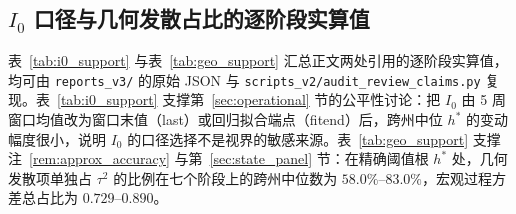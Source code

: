 \documentclass[10pt,UTF8,a4paper,zihao=-4]{ctexart}
\theoremstyle{plain}
\theoremstyle{remark}
\begin{document}
\subsection{$I_0$ 口径与几何发散占比的逐阶段实算值}\label{app:support}

表~\ref{tab:i0_support} 与表~\ref{tab:geo_support} 汇总正文两处引用的逐阶段实算值，均可由 \texttt{reports\_v3/} 的原始 JSON 与 \texttt{scripts\_v2/audit\_review\_claims.py} 复现。表~\ref{tab:i0_support} 支撑第~\ref{sec:operational} 节的公平性讨论：把 $I_0$ 由 5 周窗口均值改为窗口末值（\textsf{last}）或回归拟合端点（\textsf{fitend}）后，跨州中位 $h^*$ 的变动幅度很小，说明 $I_0$ 的口径选择不是视界的敏感来源。表~\ref{tab:geo_support} 支撑注~\ref{rem:approx_accuracy} 与第~\ref{sec:state_panel} 节：在精确阈值根 $h^*$ 处，几何发散项单独占 $\tau^2$ 的比例在七个阶段上的跨州中位数为 $58.0\%$--$83.0\%$，宏观过程方差总占比为 $0.729$--$0.890$。

\begin{table}[htbp]
\centering
\footnotesize
\setlength{\tabcolsep}{4pt}
\caption{$I_0$ 口径重定标下跨州中位 $h^*$ 的相对变动（\%）}
\label{tab:i0_support}

\end{table}

\begin{table}[htbp]
\centering
\footnotesize
\setlength{\tabcolsep}{4pt}
\caption{精确阈值根 $h^*$ 处的方差构成占比（跨州中位数）}
\label{tab:geo_support}

\end{table}

\small


\end{document}
